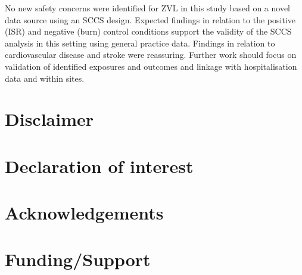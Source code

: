 \documentclass[review, endfloat]{elsarticle}
\begin{document}
No new safety concerns were identified for ZVL in this study based on a novel data source using an SCCS design. Expected findings in relation to the positive (ISR) and negative (burn) control conditions support the validity of the SCCS analysis in this setting using general practice data. Findings in relation to cardiovascular disease and stroke were reassuring. Further work should focus on validation of identified exposures and outcomes and linkage with hospitalisation data and within sites.

\section{Disclaimer}

\section{Declaration of interest}

\section{Acknowledgements}

\section{Funding/Support}

\listoftodos[Notes]




\end{document}
